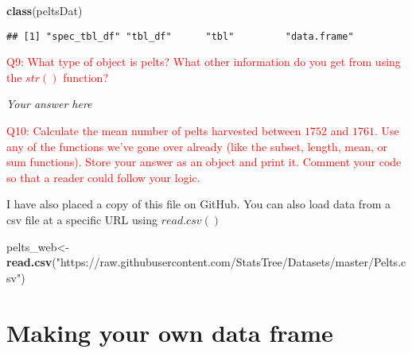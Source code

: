 \documentclass[]{article}
\newenvironment{Shaded}{\begin{snugshade}}{\end{snugshade}}
\newcommand{\CommentTok}[1]{\textcolor[rgb]{0.56,0.35,0.01}{\textit{#1}}}
\newcommand{\DecValTok}[1]{\textcolor[rgb]{0.00,0.00,0.81}{#1}}
\newcommand{\KeywordTok}[1]{\textcolor[rgb]{0.13,0.29,0.53}{\textbf{#1}}}
\newcommand{\NormalTok}[1]{#1}
\newcommand{\OperatorTok}[1]{\textcolor[rgb]{0.81,0.36,0.00}{\textbf{#1}}}
\newcommand{\StringTok}[1]{\textcolor[rgb]{0.31,0.60,0.02}{#1}}
\begin{document}
\begin{Shaded}
\begin{Highlighting}[]
\KeywordTok{class}\NormalTok{(peltsDat)}
\end{Highlighting}
\end{Shaded}

\begin{verbatim}
## [1] "spec_tbl_df" "tbl_df"      "tbl"         "data.frame"
\end{verbatim}

\textcolor{red}{Q9: What type of object is pelts? What other information do you get from using the $str()$ function?}

\emph{Your answer here}

\textcolor{red}{Q10: Calculate the mean number of pelts harvested between $1752$ and $1761$. Use any of the functions we've gone over already (like the subset, length, mean, or sum functions). Store your answer as an object and print it. Comment your code so that a reader could follow your logic.}

\begin{Shaded}
\end{Shaded}

I have also placed a copy of this file on GitHub. You can also load data
from a csv file at a specific URL using \(read.csv()\)

\begin{Shaded}
\begin{Highlighting}[]
\NormalTok{pelts_web<-}\KeywordTok{read.csv}\NormalTok{(}\StringTok{"https://raw.githubusercontent.com/StatsTree/Datasets/master/Pelts.csv"}\NormalTok{)}
\end{Highlighting}
\end{Shaded}

\hypertarget{making-your-own-data-frame}{%
\section{Making your own data frame}\label{making-your-own-data-frame}}
\end{document}
